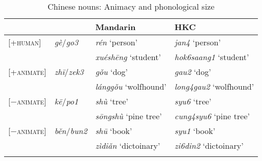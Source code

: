 \documentclass[output=paper]{langsci/langscibook}
\begin{document}
\begin{table}
\caption{Chinese nouns: Animacy and phonological size\label{tab:23.2}}
\begin{tabularx}{\textwidth}{llQQ}
\lsptoprule
                          & \Clf{}                 & Mandarin               & \gls{HKC}        \\
\midrule
{}[+\textsc{human}]       & \emph{gè}/\emph{go3}   & \emph{rén} \enquote*{person}        & \emph{jan4} \enquote*{person}            \\
		                  &                        & \emph{xuéshēng} \enquote*{student}  & \emph{hok6saang1} \enquote*{student}     \\
{}[+\textsc{animate}]     & \emph{zhī}/\emph{zek3} & \emph{gǒu} \enquote*{dog}           & \emph{gau2} \enquote*{dog}               \\
		                  &                        & \emph{lánggǒu} \enquote*{wolfhound} & \emph{long4gau2} \enquote*{wolfhound}    \\
{}[−\textsc{animate}]     & \emph{kē}/\emph{po1}   & \emph{shù} \enquote*{tree}          & \emph{syu6} \enquote*{tree}              \\
		                  &                        & \emph{sōngshù} \enquote*{pine tree} & \emph{cung4syu6} \enquote*{pine tree}    \\
{}[−\textsc{animate}]     & \emph{běn}/\emph{bun2} & \emph{shū} \enquote*{book}          & \emph{syu1} \enquote*{book}              \\
		                  &                        & \emph{zìdiǎn} \enquote*{dictoinary} & \emph{zi6din2} \enquote*{dictoinary}     \\
\lspbottomrule
\end{tabularx}
\end{table}
\end{document}
